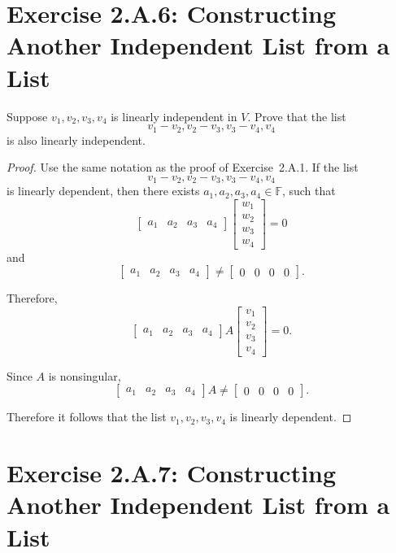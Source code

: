 \section{Exercise 2.A.6: Constructing Another Independent List from a List}
Suppose $v_1,v_2,v_3,v_4$ is linearly independent in $V$. Prove that the list\[
v_1-v_2,v_2-v_3,v_3-v_4,v_4
\] is also linearly independent. 
\begin{proof}
Use the same notation as the proof of Exercise~2.A.1. If the list\[
v_1-v_2,v_2-v_3,v_3-v_4,v_4
\] is linearly dependent, then there exists $a_1,a_2,a_3,a_4\in\mathbb{F}$, such that\[
\begin{bmatrix}
a_1&a_2&a_3&a_4
\end{bmatrix}
\begin{bmatrix}
w_1\\w_2\\w_3\\w_4
\end{bmatrix}
=0
\] and \[
\begin{bmatrix}
a_1&a_2&a_3&a_4
\end{bmatrix}\ne
\begin{bmatrix}
0&0&0&0
\end{bmatrix}.
\]

Therefore,\[
\begin{bmatrix}
a_1&a_2&a_3&a_4
\end{bmatrix}
A
\begin{bmatrix}
v_1\\v_2\\v_3\\v_4
\end{bmatrix}
=0.
\]

Since $A$ is nonsingular, \[
\begin{bmatrix}
a_1&a_2&a_3&a_4
\end{bmatrix}
A\ne
\begin{bmatrix}
0&0&0&0
\end{bmatrix}.
\]

Therefore it follows that the list $v_1,v_2,v_3,v_4$ is linearly dependent. 
\end{proof}

\section{Exercise 2.A.7: Constructing Another Independent List from a List}

